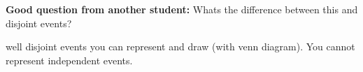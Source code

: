 \documentclass[12pt]{book}
\begin{document}
\textbf{Good question from another student:} Whats the difference between this and disjoint events?


well disjoint events you can represent and draw (with venn diagram).
You cannot represent independent events.

%
%
%
%
%
%
%
%
%
%
%
%
%
%
%
%
%
%
%
%
\end{document}
